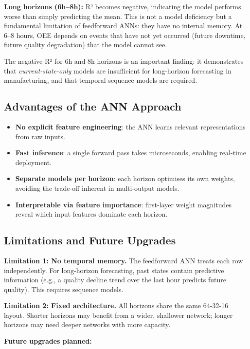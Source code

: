 \documentclass[a4paper,11pt]{article}
\begin{document}
\textbf{Long horizons (6h--8h):} R² becomes negative, indicating the model performs worse than simply predicting the mean. This is not a model deficiency but a fundamental limitation of feedforward ANNs: they have no internal memory. At 6--8 hours, OEE depends on events that have not yet occurred (future downtime, future quality degradation) that the model cannot see.

The negative R² for 6h and 8h horizons is an important finding: it demonstrates that \emph{current-state-only} models are insufficient for long-horizon forecasting in manufacturing, and that temporal sequence models are required.

\subsection{Advantages of the ANN Approach}

\begin{itemize}
    \item \textbf{No explicit feature engineering}: the ANN learns relevant representations from raw inputs.
    \item \textbf{Fast inference}: a single forward pass takes microseconds, enabling real-time deployment.
    \item \textbf{Separate models per horizon}: each horizon optimises its own weights, avoiding the trade-off inherent in multi-output models.
    \item \textbf{Interpretable via feature importance}: first-layer weight magnitudes reveal which input features dominate each horizon.
\end{itemize}

\subsection{Limitations and Future Upgrades}

\textbf{Limitation 1: No temporal memory.} The feedforward ANN treats each row independently. For long-horizon forecasting, past states contain predictive information (e.g., a quality decline trend over the last hour predicts future quality). This requires sequence models.

\textbf{Limitation 2: Fixed architecture.} All horizons share the same 64-32-16 layout. Shorter horizons may benefit from a wider, shallower network; longer horizons may need deeper networks with more capacity.

\textbf{Future upgrades planned:}
\end{document}
